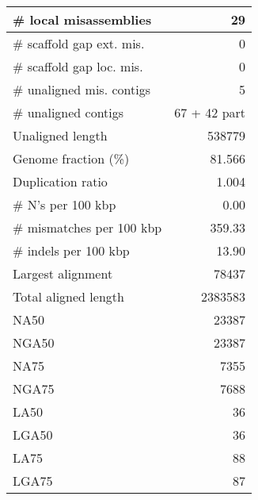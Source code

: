 \documentclass[12pt,a4paper]{article}
\begin{document}
\begin{table}[ht]
\begin{center}
\begin{tabular}{|l*{1}{|r}|}
\# local misassemblies & 29 \\ \hline
\# scaffold gap ext. mis. & 0 \\ \hline
\# scaffold gap loc. mis. & 0 \\ \hline
\# unaligned mis. contigs & 5 \\ \hline
\# unaligned contigs & 67 + 42 part \\ \hline
Unaligned length & 538779 \\ \hline
Genome fraction (\%) & 81.566 \\ \hline
Duplication ratio & 1.004 \\ \hline
\# N's per 100 kbp & 0.00 \\ \hline
\# mismatches per 100 kbp & 359.33 \\ \hline
\# indels per 100 kbp & 13.90 \\ \hline
Largest alignment & 78437 \\ \hline
Total aligned length & 2383583 \\ \hline
NA50 & 23387 \\ \hline
NGA50 & 23387 \\ \hline
NA75 & 7355 \\ \hline
NGA75 & 7688 \\ \hline
LA50 & 36 \\ \hline
LGA50 & 36 \\ \hline
LA75 & 88 \\ \hline
LGA75 & 87 \\ \hline
\end{tabular}
\end{center}
\end{table}
\end{document}
